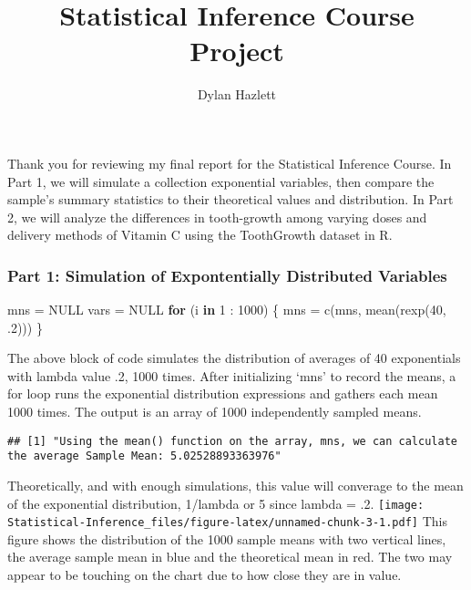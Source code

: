\documentclass[
]{article}
\title{Statistical Inference Course Project}
\author{Dylan Hazlett}
\date{}
\newenvironment{Shaded}{\begin{snugshade}}{\end{snugshade}}
\newcommand{\ConstantTok}[1]{\textcolor[rgb]{0.00,0.00,0.00}{#1}}
\newcommand{\ControlFlowTok}[1]{\textcolor[rgb]{0.13,0.29,0.53}{\textbf{#1}}}
\newcommand{\DecValTok}[1]{\textcolor[rgb]{0.00,0.00,0.81}{#1}}
\newcommand{\FunctionTok}[1]{\textcolor[rgb]{0.00,0.00,0.00}{#1}}
\newcommand{\NormalTok}[1]{#1}
\newcommand{\OtherTok}[1]{\textcolor[rgb]{0.56,0.35,0.01}{#1}}
\newcommand{\SpecialCharTok}[1]{\textcolor[rgb]{0.00,0.00,0.00}{#1}}
\begin{document}
\maketitle

Thank you for reviewing my final report for the Statistical Inference
Course. In Part 1, we will simulate a collection exponential variables,
then compare the sample's summary statistics to their theoretical values
and distribution. In Part 2, we will analyze the differences in
tooth-growth among varying doses and delivery methods of Vitamin C using
the ToothGrowth dataset in R.

\hypertarget{part-1-simulation-of-expontentially-distributed-variables}{%
\subsubsection{Part 1: Simulation of Expontentially Distributed
Variables}\label{part-1-simulation-of-expontentially-distributed-variables}}

\begin{Shaded}
\begin{Highlighting}[]
\NormalTok{mns }\OtherTok{=} \ConstantTok{NULL}
\NormalTok{vars }\OtherTok{=} \ConstantTok{NULL}
\ControlFlowTok{for}\NormalTok{ (i }\ControlFlowTok{in} \DecValTok{1} \SpecialCharTok{:} \DecValTok{1000}\NormalTok{) \{}
\NormalTok{  mns }\OtherTok{=} \FunctionTok{c}\NormalTok{(mns, }\FunctionTok{mean}\NormalTok{(}\FunctionTok{rexp}\NormalTok{(}\DecValTok{40}\NormalTok{, .}\DecValTok{2}\NormalTok{))) }
\NormalTok{\}}
\end{Highlighting}
\end{Shaded}

The above block of code simulates the distribution of averages of 40
exponentials with lambda value .2, 1000 times. After initializing `mns'
to record the means, a for loop runs the exponential distribution
expressions and gathers each mean 1000 times. The output is an array of
1000 independently sampled means.

\begin{verbatim}
## [1] "Using the mean() function on the array, mns, we can calculate the average Sample Mean: 5.02528893363976"
\end{verbatim}

Theoretically, and with enough simulations, this value will converage to
the mean of the exponential distribution, 1/lambda or 5 since lambda =
.2.
\texttt{[image: Statistical-Inference\_files/figure-latex/unnamed-chunk-3-1.pdf]}
This figure shows the distribution of the 1000 sample means with two
vertical lines, the average sample mean in blue and the theoretical mean
in red. The two may appear to be touching on the chart due to how close
they are in value.
\end{document}
